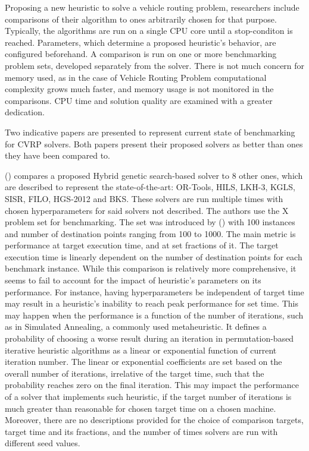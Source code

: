 \documentclass[a4paper,12pt]{report}
\begin{document}
{Proposing a new heuristic to solve a vehicle routing problem, researchers include comparisons of their algorithm to ones arbitrarily chosen for that purpose. Typically, the algorithms are run on a single CPU core until a stop-conditon is reached. Parameters, which determine a proposed heuristic's behavior, are configured beforehand. A comparison is run on one or more benchmarking problem sets, developed separately from the solver. There is not much concern for memory used, as in the case of Vehicle Routing Problem computational complexity grows much faster, and memory usage is not monitored in the comparisons. CPU time and solution quality are examined with a greater dedication. 

Two indicative papers are presented to represent current state of benchmarking for CVRP solvers. Both papers present their proposed solvers as better than ones they have been compared to.

 (\citeyear{vidalHybridGeneticSearch2022}) compares a proposed Hybrid genetic search-based solver to 8 other ones, which are described to represent the state-of-the-art: OR-Tools, HILS, LKH-3, KGLS, SISR, FILO, HGS-2012 and BKS. These solvers are run multiple times with chosen hyperparameters for said solvers not described. The authors use the X problem set for benchmarking. The set was introduced by  (\citeyear{uchoaNew}) with 100 instances and number of destination points ranging from 100 to 1000. The main metric is performance at target execution time, and at set fractions of it. The target execution time is linearly dependent on the number of destination points for each benchmark instance. While this comparison is relatively more comprehensive, it seems to fail to account for the impact of heuristic's parameters on its performance. For instance, having hyperparameters be independent of target time may result in a heuristic's inability to reach peak performance for set time. This may happen when the performance is a function of the number of iterations, such as in Simulated Annealing, a commonly used metaheuristic. It defines a probability of choosing a worse result during an iteration in permutation-based iterative heuristic algorithms as a linear or exponential function of current iteration number. The linear or exponential coefficients are set based on the overall number of iterations, irrelative of the target time, such that the probability reaches zero on the final iteration. This may impact the performance of a solver that implements such heuristic, if the target number of iterations is much greater than reasonable for chosen target time on a chosen machine. Moreover, there are no descriptions provided for the choice of comparison targets, target time and its fractions, and the number of times solvers are run with different seed values.

}
\end{document}

